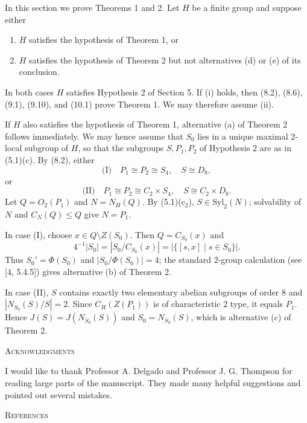 \documentclass[11pt]{article}
\theoremstyle{plain}
\theoremstyle{stmplain}
\begin{document}
\noindent In this section we prove Theorems 1 and 2. Let $H$ be a finite
group and suppose either
\begin{enumerate}
\item[(i)] $H$ satisfies the hypothesis of Theorem 1, or
\item[(ii)] $H$ satisfies the hypothesis of Theorem 2 but not alternatives
  (d) or (e) of its conclusion.
\end{enumerate}
In both cases $H$ satisfies Hypothesis 2 of Section 5. If (i) holds, then
(8.2), (8.6), (9.1), (9.10), and (10.1) prove Theorem 1. We may therefore
assume (ii).

\noindent If $H$ also satisfies the hypothesis of Theorem 1, alternative
(a) of Theorem 2 follows immediately. We may hence assume that $S_0$ lies
in a unique maximal 2-local subgroup of $H$, so that the subgroups
$S,P_1,P_2$ of Hypothesis 2 are as in (5.1)(c). By (8.2), either
\[
 \text{(I)}\quad P_1\cong P_2\cong S_4,\quad S\cong D_8,
\]
or
\[
 \text{(II)}\quad P_1\cong P_2\cong C_2\times S_4,\quad
 S\cong C_2\times D_8.
\]
Let $Q=O_2(P_1)$ and $N=N_H(Q)$. By (5.1)(c$_2$),
$S\in\mathrm{Syl}_2(N)$; solvability of $N$ and
$C_N(Q)\le Q$ give $N=P_1$.

\noindent In case (I), choose $x\in Q\setminus Z(S_0)$. Then
$Q=C_{S_0}(x)$ and
\[
  4^{-1}|S_0|=|S_0/C_{S_0}(x)|
  =|\{[s,x]\mid s\in S_0\}|.
\]
Thus $S_0'=\Phi(S_0)$ and $|S_0/\Phi(S_0)|=4$; the standard
2-group calculation (see [4, 5.4.5]) gives alternative (b) of Theorem 2.

\noindent In case (II), $S$ contains exactly two elementary abelian
subgroups of order $8$ and $|N_{S_0}(S)/S|=2$. Since
$C_H(Z(P_1))$ is of characteristic 2 type, it equals $P_1$. Hence
$J(S)=J(N_{S_0}(S))$ and $S_0=N_{S_0}(S)$, which is alternative (c) of
Theorem 2.

\bigskip
\begin{center}
\textsc{Acknowledgments}
\end{center}

\noindent I would like to thank Professor A. Delgado and Professor J. G.
Thompson for reading large parts of the manuscript. They made many helpful
suggestions and pointed out several mistakes.

\bigskip
\begin{center}
\textsc{References}
\end{center}
\end{document}
